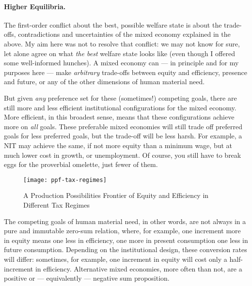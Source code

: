 \paragraph[Higher Equilibria]{Higher Equilibria.}
The first-order conflict about the best, possible welfare state is about the trade-offs, contradictions and uncertainties of the mixed economy explained in the above.
My aim here was not to resolve that conflict:
we may not know for sure, let alone agree on what \emph{the best} welfare state looks like (even though I offered some well-informed hunches).
A mixed economy can --- in principle and for my purposes here --- make \emph{arbitrary} trade-offs between equity and efficiency, presence and future, or any of the other dimensions of human material need.


But given \emph{any} preference set for these (sometimes!) competing goals, there are still more and less efficient institutional configurations for the mixed economy.
More efficient, in this broadest sense, means that these configurations achieve more on \emph{all} goals.
These preferable mixed economies will still trade off preferred goals for less preferred goals, but the trade-off will be less harsh.
For example, a \gls{NIT} may achieve the same, if not more equity than a minimum wage, but at much lower cost in growth, or unemployment.
Of course, you still have to break eggs for the proverbial omelette, just fewer of them.


\begin{figure}[htbp]
	\centering
	\texttt{[image: ppf-tax-regimes]}
	\caption[Equity-Efficiency Trade-offs of Different Tax Regimes]{A Production Possibilities Frontier of Equity and Efficiency in Different Tax Regimes}
	\label{fig:ppf-tax-regimes} %
\end{figure}

The competing goals of human material need, in other words, are not always in a pure and immutable zero-sum relation, where, for example, one increment more in equity means one less in efficiency, one more in present consumption one less in future consumption.
Depending on the institutional design, these conversion rates will differ:
sometimes, for example, one increment in equity will cost only a half-increment in efficiency.
Alternative mixed economies, more often than not, are a positive or --- equivalently --- negative sum proposition.


